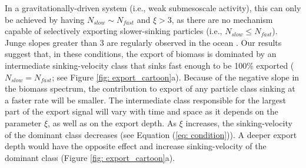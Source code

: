 \documentclass[draft,linenumbers]{agujournal2018}
\begin{document}
In a gravitationally-driven system (i.e., weak submesoscale activity), this can only be achieved by having  $N_{slow} \sim N_{fast}$ and $\xi>3$, as there are no mechanism capable of selectively exporting slower-sinking particles (i.e., $N_{slow} \leq N_{fast}$). Junge slopes greater than 3 are regularly observed in the ocean \citep{Kostadinov_2009, White_2015}. Our results suggest that, in these conditions, the export of biomass is dominated by an intermediate sinking-velocity class that sinks fast enough to be 100\% exported ($N_{slow} = N_{fast}$; see Figure \ref{fig: export_cartoon}a). Because of the negative slope in the biomass spectrum, the contribution to export of any particle class sinking at a faster rate will be smaller. The intermediate class responsible for the largest part of the export signal will vary with time and space as it depends on the parameter $\xi$, as well as on the export depth. As $\xi$ increases, the sinking-velocity of the dominant class decreases (see Equation (\ref{eq: condition})). A deeper export depth would have the opposite effect and increase sinking-velocity of the dominant class (Figure \ref{fig: export_cartoon}a). %
\end{document}
